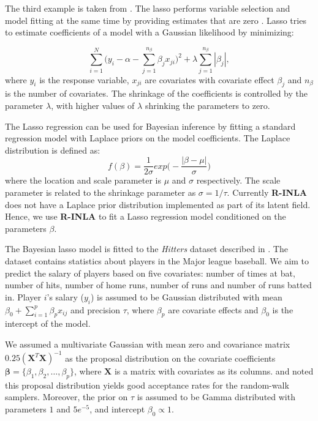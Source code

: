 \documentclass[
]{article}
\begin{document}
The third example is taken from \citet{gomez2018markov}. The lasso
performs variable selection and model fitting at the same time by
providing estimates that are zero \citep{hastie2009introduction}. Lasso
tries to estimate coefficients of a model with a Gaussian likelihood by
minimizing:

\begin{equation}
\sum_{i = 1}^{N} \bigg( y_i - \alpha - \sum_{j = 1}^{n_{\beta}} \beta_j x_{ji} \bigg)^2 + \lambda \sum_{j = 1}^{n_{\beta}}|\beta_j|,
\end{equation} where \(y_i\) is the response variable, \(x_{ji}\) are
covariates with covariate effect \(\beta_j\) and \(n_{\beta}\) is the
number of covariates. The shrinkage of the coefficients is controlled by
the parameter \(\lambda\), with higher values of \(\lambda\) shrinking
the parameters to zero.

The Lasso regression can be used for Bayesian inference by fitting a
standard regression model with Laplace priors on the model coefficients.
The Laplace distribution is defined as: \begin{equation}
f(\beta) = \frac{1}{2 \sigma} exp \bigg(- \frac{|\beta - \mu|}{\sigma}  \bigg)
\end{equation} where the location and scale parameter is \(\mu\) and
\(\sigma\) respectively. The scale parameter is related to the shrinkage
parameter as \(\sigma = 1/\tau\). Currently \textbf{R-INLA} does not
have a Laplace prior distribution implemented as part of its latent
field. Hence, we use \textbf{R-INLA} to fit a Lasso regression model
conditioned on the parameters \(\beta\).

The Bayesian lasso model is fitted to the \textit{Hitters} dataset
described in \citet{gareth2013introduction}. The dataset contains
statistics about players in the Major league baseball. We aim to predict
the salary of players based on five covariates: number of times at bat,
number of hits, number of home runs, number of runs and number of runs
batted in. Player \(i\)'s salary (\(y_i\)) is assumed to be Gaussian
distributed with mean \(\beta_0 + \sum_{i=1}^{p} \beta_{p} x_{ij}\) and
precision \(\tau\), where \(\beta_{p}\) are covariate effects and
\(\beta_0\) is the intercept of the model.

We assumed a multivariate Gaussian with mean zero and covariance matrix
\(0.25(\textbf{X}^T\textbf{X})^{-1}\) as the proposal distribution on
the covariate coefficients
\(\mathbf{\beta} = \{\beta_1, \beta_2, \ldots, \beta_p \}\), where
\(\textbf{X}\) is a matrix with covariates as its columns.
\cite{gomez2018markov} and \cite{berild2022importance} noted this
proposal distribution yields good acceptance rates for the random-walk
samplers. Moreover, the prior on \(\tau\) is assumed to be Gamma
distributed with parameters \(1\) and \(5e^{-5}\), and intercept
\(\beta_0 \propto 1\).
\end{document}
